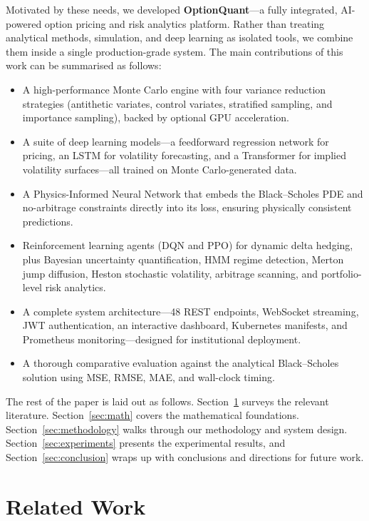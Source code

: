 \documentclass[conference]{IEEEtran}
\begin{document}
Motivated by these needs, we developed \textbf{OptionQuant}---a fully integrated, AI-powered option pricing and risk analytics platform. Rather than treating analytical methods, simulation, and deep learning as isolated tools, we combine them inside a single production-grade system. The main contributions of this work can be summarised as follows:

\begin{itemize}
    \item A high-performance Monte Carlo engine with four variance reduction strategies (antithetic variates, control variates, stratified sampling, and importance sampling), backed by optional GPU acceleration.
    \item A suite of deep learning models---a feedforward regression network for pricing, an LSTM for volatility forecasting, and a Transformer for implied volatility surfaces---all trained on Monte Carlo-generated data.
    \item A Physics-Informed Neural Network that embeds the Black--Scholes PDE and no-arbitrage constraints directly into its loss, ensuring physically consistent predictions.
    \item Reinforcement learning agents (DQN and PPO) for dynamic delta hedging, plus Bayesian uncertainty quantification, HMM regime detection, Merton jump diffusion, Heston stochastic volatility, arbitrage scanning, and portfolio-level risk analytics.
    \item A complete system architecture---48 REST endpoints, WebSocket streaming, JWT authentication, an interactive dashboard, Kubernetes manifests, and Prometheus monitoring---designed for institutional deployment.
    \item A thorough comparative evaluation against the analytical Black--Scholes solution using MSE, RMSE, MAE, and wall-clock timing.
\end{itemize}

The rest of the paper is laid out as follows. Section~\ref{sec:related} surveys the relevant literature. Section~\ref{sec:math} covers the mathematical foundations. Section~\ref{sec:methodology} walks through our methodology and system design. Section~\ref{sec:experiments} presents the experimental results, and Section~\ref{sec:conclusion} wraps up with conclusions and directions for future work.

\section{Related Work}\label{sec:related}
\end{document}
